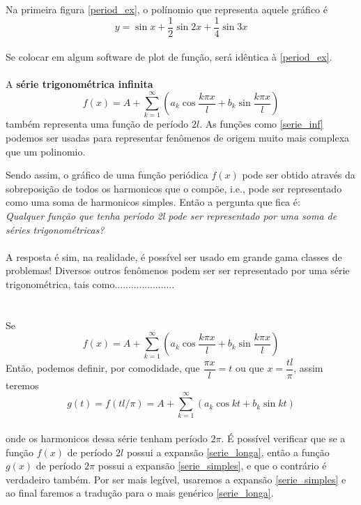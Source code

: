 \documentclass{article}
\begin{document}
Na primeira figura \ref{period_ex}, o polínomio que representa aquele gráfico é\\
\begin{equation}
    y = \sin{x} + \dfrac{1}{2}\sin{2x} + \dfrac{1}{4}\sin{3x}
\end{equation}
\\
Se colocar em algum software de plot de função, será idêntica à \ref{period_ex}.\\
\\
A \textbf{série trigonométrica infinita}\\ 
\begin{equation}
\label{serie_inf}
    f(x) = A + \sum\limits_{k=1}^{\infty}(a_k\cos{\dfrac{k\pi x}{l}} + b_k\sin{\dfrac{k\pi x}{l}})
\end{equation}
também representa uma função de período $2l$. As funções como \ref{serie_inf} podemos
ser usadas para representar fenômenos de origem muito mais complexa que um polinomio.

Sendo assim, o gráfico de uma função periódica $f(x)$ pode ser obtido através da 
sobreposição de todos os harmonicos que o compõe, i.e., pode ser representado
como uma soma de harmonicos simples.
Então a pergunta que fica é:\\
\textit{Qualquer função que tenha período 2l pode ser representado por uma soma de séries 
trigonométricas?}\\
\\
A resposta é sim, na realidade, é possível ser usado em grande gama classes de problemas!
Diversos outros fenômenos podem ser ser representado por uma série trigonométrica,
tais como......................\\ 
\\
\\  
Se\\
\begin{equation}
\label{serie_longa}
    f(x) = A + \sum\limits_{k=1}^{\infty}(a_k\cos{\dfrac{k\pi x}{l}} + b_k\sin{\dfrac{k\pi x}{l}})
\end{equation}
Então, podemos definir, por comodidade, que $\dfrac{\pi x}{l} = t$ ou que $x = \dfrac{tl}{\pi}$,
assim teremos\\
\begin{equation}
\label{serie_simples}
    g(t) = f(tl/\pi) = A + \sum\limits_{k=1}^{\infty}(a_k\cos{kt} + b_k\sin{kt})
\end{equation}
\\
onde os harmonicos dessa série tenham período $2\pi$. É possível verificar que 
se a função $f(x)$ de período $2l$ possui a expansão \ref{serie_longa}, então
a função $g(x)$ de período $2\pi$ possui a expansão \ref{serie_simples}, e que
o contrário é verdadeiro também. Por ser mais legível, usaremos a expansão 
\ref{serie_simples} e ao final faremos a tradução para o mais genérico 
\ref{serie_longa}.\\
\end{document}
